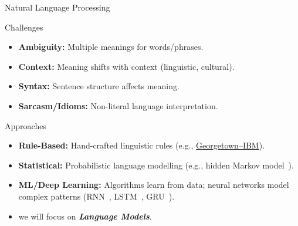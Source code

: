 \documentclass[presentation, 10pt]{beamer}\mode<presentation>{\usetheme{AMSBolognaFC}}
\begin{document}
\begin{frame}{Natural Language Processing}
    \begin{alertblock}{Challenges}
        \begin{itemize}
            \item \textbf{Ambiguity:} Multiple meanings for words/phrases.
            \item \textbf{Context:} Meaning shifts with context (linguistic, cultural).
            \item \textbf{Syntax:} Sentence structure affects meaning.
            \item \textbf{Sarcasm/Idioms:} Non-literal language interpretation.
        \end{itemize}
    \end{alertblock}
    \begin{exampleblock}{Approaches}
        \begin{itemize}
            \item \textbf{Rule-Based:} Hand-crafted linguistic rules (e.g., \href{https://en.wikipedia.org/wiki/Georgetown-IBM\_experiment}{Georgetown–IBM}).
            \item \textbf{Statistical:} Probabilistic language modelling (e.g., hidden Markov model~\cite{DBLP:journals/coling/Merialdo94}).
            \item \textbf{ML/Deep Learning:} Algorithms learn from data; neural networks model complex patterns (RNN~\cite{DBLP:journals/corr/0001KYS17}, LSTM~\cite{DBLP:journals/neco/HochreiterS97}, GRU~\cite{DBLP:conf/mwscas/DeyS17}).
            \item[\faArrowRight] we will focus on \emph{\textbf{Language Models}}.
        \end{itemize}
    \end{exampleblock}
\end{frame}
\end{document}
